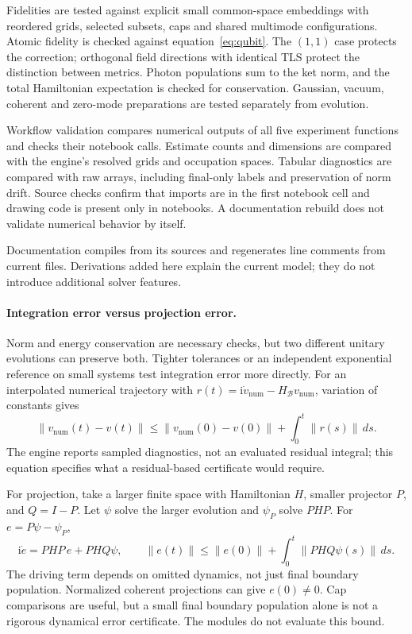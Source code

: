 \documentclass[11pt,a4paper]{article}
\newcommand{\ii}{\mathrm{i}}
\newcommand{\B}{\mathcal B}
\begin{document}
Fidelities are tested against explicit small common-space embeddings with
reordered grids, selected subsets, caps and shared multimode configurations.
Atomic fidelity is checked against equation~\eqref{eq:qubit}. The $(1,1)$
case protects the correction; orthogonal field directions with identical TLS
protect the distinction between metrics. Photon populations sum to the
ket norm, and the total Hamiltonian expectation is checked for conservation. Gaussian, vacuum,
coherent and zero-mode preparations are tested separately from evolution.

Workflow validation compares numerical outputs of all five experiment functions
and checks their notebook calls. Estimate counts and dimensions are compared with the engine's
resolved grids and occupation spaces. Tabular diagnostics are compared with raw
arrays, including final-only labels and preservation of norm drift. Source
checks confirm that imports are in the first notebook cell and drawing code is
present only in notebooks. A documentation rebuild does not validate numerical
behavior by itself.

Documentation compiles from its sources and regenerates line comments from
current files. Derivations added here explain the current model; they do
not introduce additional solver features.

\paragraph{Integration error versus projection error.}
Norm and energy conservation are necessary checks, but two different unitary
evolutions can preserve both. Tighter tolerances or an independent exponential
reference on small systems test integration error more directly.
For an interpolated numerical trajectory with
$r(t)=\ii\dot v_{\mathrm{num}}-H_{\B}v_{\mathrm{num}}$, variation of constants gives
\begin{equation}
 \|v_{\mathrm{num}}(t)-v(t)\|
 \leq\|v_{\mathrm{num}}(0)-v(0)\|+\int_0^t\|r(s)\|\,ds.
 \label{eq:numericalbound}
\end{equation}
The engine reports sampled diagnostics, not an evaluated residual integral;
this equation specifies what a residual-based certificate would require.

For projection, take a larger finite space with Hamiltonian $H$, smaller
projector $P$, and $Q=I-P$. Let $\psi$ solve the larger evolution and $\psi_P$
solve $PHP$. For $e=P\psi-\psi_P$,
\begin{equation}
 \ii\dot e=PHP\,e+PHQ\psi,\qquad
 \|e(t)\|\leq\|e(0)\|+\int_0^t\|PHQ\psi(s)\|\,ds.
 \label{eq:projectionbound}
\end{equation}
The driving term depends on omitted dynamics, not just final boundary
population. Normalized coherent projections can give $e(0)\ne0$.
Cap comparisons are useful, but a small final boundary population alone
is not a rigorous dynamical error certificate. The modules do not evaluate
this bound.
\end{document}

